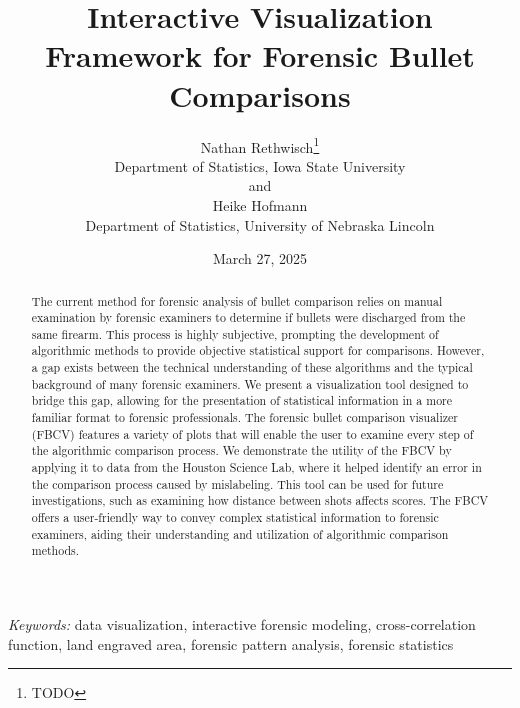 \documentclass[
  12pt]{article}
\begin{document}
\def\spacingset#1{\renewcommand{\baselinestretch}%
{#1}\small\normalsize} \spacingset{1}



\date{March 27, 2025}
\title{\bf Interactive Visualization Framework for Forensic Bullet
Comparisons}
\author{
Nathan Rethwisch\thanks{TODO}\\
Department of Statistics, Iowa State University\\
and\\Heike Hofmann\\
Department of Statistics, University of Nebraska Lincoln\\
}
\maketitle

\bigskip
\bigskip
\begin{abstract}
The current method for forensic analysis of bullet comparison relies on
manual examination by forensic examiners to determine if bullets were
discharged from the same firearm. This process is highly subjective,
prompting the development of algorithmic methods to provide objective
statistical support for comparisons. However, a gap exists between the
technical understanding of these algorithms and the typical background
of many forensic examiners. We present a visualization tool designed to
bridge this gap, allowing for the presentation of statistical
information in a more familiar format to forensic professionals. The
forensic bullet comparison visualizer (FBCV) features a variety of plots
that will enable the user to examine every step of the algorithmic
comparison process. We demonstrate the utility of the FBCV by applying
it to data from the Houston Science Lab, where it helped identify an
error in the comparison process caused by mislabeling. This tool can be
used for future investigations, such as examining how distance between
shots affects scores. The FBCV offers a user-friendly way to convey
complex statistical information to forensic examiners, aiding their
understanding and utilization of algorithmic comparison methods.
\end{abstract}

\noindent%
{\it Keywords:} data visualization, interactive forensic
modeling, cross-correlation function, land engraved area, forensic
pattern analysis, forensic statistics
\vfill

\newpage
\spacingset{1.9} %
\end{document}
